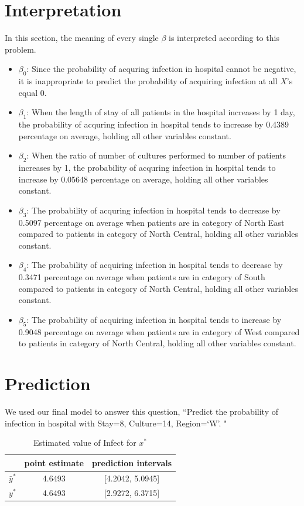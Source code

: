 \documentclass[a4paper,11pt,onecolumn,twoside]{article}
\begin{document}
\section{Interpretation}
In this section, the meaning of every single $\beta$ is interpreted according to this problem.
\begin{itemize}
	\item $\beta_{0}$: Since the probability of acquring infection in hospital cannot be negative, it is inappropriate to predict the probability of acquiring infection at all $X$'s equal 0.
	\item $\beta_1$: When the length of stay of all patients in the hospital increases by 1 day, the probability of acquring infection in hospital tends to increase by 0.4389 percentage on average, holding all other variables constant.
	\item $\beta_2$: When the ratio of number of cultures performed to number of patients increases by 1, the probability of acquring infection in hospital tends to increase by 0.05648 percentage on average, holding all other variables constant.
	\item $\beta_{3}$: The probability of acquring infection in hospital tends to decrease by 0.5097 percentage on average when patients are in category of North East compared to patients in category of North Central, holding all other variables constant.
	\item $\beta_{4}$: The probability of acquiring infection in hospital tends to decrease by 0.3471 percentage on average when patients are in category of South compared to patients in category of North Central, holding all other variables constant.
	\item $\beta_{5}$: The probability of acquiring infection in hospital tends to increase by 0.9048 percentage on average when patients are in category of West compared to patients in category of North Central, holding all other variables constant.
	
\end{itemize}
\section{Prediction}
We used our final model to answer this question, 
``Predict the probability of infection in hospital with Stay=8, Culture=14, Region=`W'. "

\begin{table}[H]
	\centering
	\begin{tabular}{ccc}
		\midrule[1.5pt]	
		&point estimate &prediction intervals\\
		\hline
		$\bar{y}^{*}$&4.6493 	&[4.2042, 5.0945]\\
		$y^{*}$&4.6493			&[2.9272, 6.3715]\\
		\midrule[1.5pt]
	\end{tabular}
	\caption{Estimated value of Infect for $x^{*}$}
\end{table}
\end{document}
